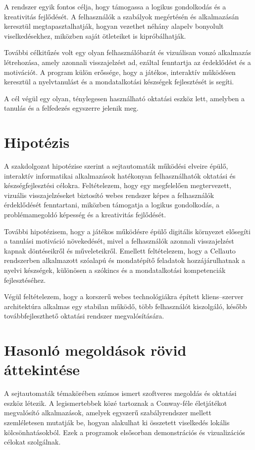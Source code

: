 \documentclass{thesis-ekf}
\begin{document}
A rendszer egyik fontos célja, hogy támogassa a logikus gondolkodás és a kreativitás fejlődését. A felhasználók a szabályok megértésén és alkalmazásán keresztül megtapasztalhatják, hogyan vezethet néhány alapelv bonyolult viselkedésekhez, miközben saját ötleteiket is kipróbálhatják.

További célkitűzés volt egy olyan felhasználóbarát és vizuálisan vonzó alkalmazás létrehozása, amely azonnali visszajelzést ad, ezáltal fenntartja az érdeklődést és a motivációt. A program külön erőssége, hogy a játékos, interaktív működésen keresztül a nyelvtanulást és a mondatalkotási készségek fejlesztését is segíti.

A cél végül egy olyan, ténylegesen használható oktatási eszköz lett, amelyben a tanulás és a felfedezés egyszerre jelenik meg.

\section{Hipotézis}
A szakdolgozat hipotézise szerint a sejtautomaták működési elveire épülő, interaktív informatikai alkalmazások hatékonyan felhasználhatók oktatási és készségfejlesztési célokra. Feltételezem, hogy egy megfelelően megtervezett, vizuális visszajelzéseket biztosító webes rendszer képes a felhasználók érdeklődését fenntartani, miközben támogatja a logikus gondolkodás, a problémamegoldó képesség és a kreativitás fejlődését.

További hipotézisem, hogy a játékos működésre épülő digitális környezet elősegíti a tanulási motiváció növekedését, mivel a felhasználók azonnali visszajelzést kapnak döntéseikről és műveleteikről. Emellett feltételezem, hogy a Cellauto rendszerben alkalmazott szóalapú és mondatépítő feladatok hozzájárulhatnak a nyelvi készségek, különösen a szókincs és a mondatalkotási kompetenciák fejlesztéséhez.

Végül feltételezem, hogy a korszerű webes technológiákra épített kliens--szerver architektúra alkalmas egy stabilan működő, több felhasználót kiszolgáló, később továbbfejleszthető oktatási rendszer megvalósítására.

\section{Hasonló megoldások rövid áttekintése}
A sejtautomaták témakörében számos ismert szoftveres megoldás és oktatási eszköz létezik. A legismertebbek közé tartoznak a Conway-féle életjátékot megvalósító alkalmazások, amelyek egyszerű szabályrendszer mellett szemléletesen mutatják be, hogyan alakulhat ki összetett viselkedés lokális kölcsönhatásokból. Ezek a programok elsősorban demonstrációs és vizualizációs célokat szolgálnak.
\end{document}
